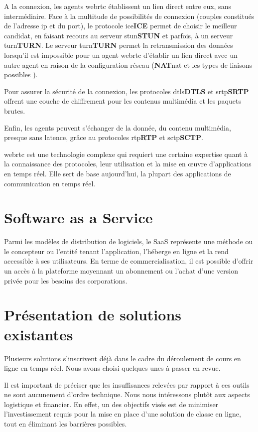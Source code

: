 A la connexion, les agents \acrshort{webrtc} établissent un lien direct entre eux, sans intermédiaire. 
Face à la multitude de possibilités de connexion (couples constitués de l’adresse \acrshort{ip} et du port), 
le protocole \acrshort{ice}\textbf{ICE} permet de choisir le meilleur candidat, en faisant recours au serveur \acrshort{stun}\textbf{STUN} et parfois, à un serveur \acrshort{turn}\textbf{TURN}. 
Le serveur \acrshort{turn}\textbf{TURN} permet la retransmission des données lorsqu’il est impossible pour un agent \acrshort{webrtc} d'établir un lien 
direct avec un autre agent en raison de la configuration réseau (\textbf{NAT}\acrshort{nat} et les types de liaisons possibles \cite{nat_links}).

Pour assurer la sécurité de la connexion, les protocoles \acrshort{dtls}\textbf{DTLS} et \acrshort{srtp}\textbf{SRTP} offrent une couche de chiffrement 
pour les contenus multimédia et les paquets brutes.

Enfin, les agents peuvent s'échanger de la donnée, du contenu multimédia, presque sans latence, grâce au protocoles \acrshort{rtp}\textbf{RTP} et \acrshort{sctp}\textbf{SCTP}.

\acrshort{webrtc} est une technologie complexe qui requiert une certaine expertise quant à la connaissance des protocoles, 
leur utilisation et la mise en œuvre d'applications en temps réel. 
Elle sert de base aujourd’hui,  la plupart des applications de communication en temps réel.

\section{Software as a Service}
Parmi les modèles de distribution de logiciels, le SaaS représente une méthode ou le concepteur ou l'entité tenant l’application, 
l'héberge en ligne et la rend accessible à ses utilisateurs. 
En terme de commercialisation, il est possible d’offrir un accès à la plateforme moyennant un abonnement ou 
l’achat d’une version privée pour les besoins des corporations.

\section{Présentation de solutions existantes}
Plusieurs solutions s’inscrivent déjà dans le cadre du déroulement de cours en ligne en temps réel. 
Nous avons choisi quelques unes à passer en revue.

Il est important de préciser que les insuffisances relevées par rapport à ces outils ne sont aucunement d’ordre technique. 
Nous nous intéressons plutôt aux aspects logistique et financier. 
En effet, un des objectifs visés est de minimiser l’investissement requis pour la mise en place d’une solution de classe en ligne, 
tout en éliminant les barrières possibles.

